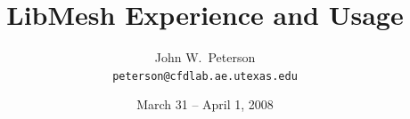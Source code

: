 \documentclass[
  compress
  ,12pt
]{beamer}
\title{LibMesh Experience and Usage}
\author{John W.\ Peterson \\ \texttt{\tiny peterson@cfdlab.ae.utexas.edu}}
\institute[UT-Austin]{Univ.\ of Texas at Austin}
\date{March 31 -- April 1, 2008}
\begin{document}
  
\begin{frame}
  \titlepage
\end{frame}








\end{document}
